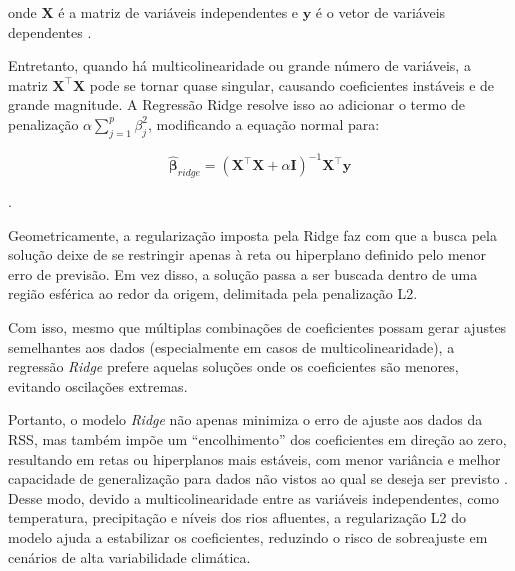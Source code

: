 \noindent onde $\mathbf{X}$ é a matriz de variáveis independentes e $\mathbf{y}$ é o vetor de variáveis dependentes \cite{montgomery2012}.

Entretanto, quando há multicolinearidade ou grande número de variáveis, a matriz $\mathbf{X}^\top \mathbf{X}$  pode se tornar quase singular, causando coeficientes instáveis e de grande magnitude. A Regressão Ridge resolve isso ao adicionar o termo de penalização $\alpha \sum_{j=1}^{p}\beta_{j}^2$, modificando a equação normal para:

\begin{equation}
	\hat{\boldsymbol\beta}_{ridge} = (\mathbf{X}^\top \mathbf{X} + \alpha \mathbf{I})^{-1} \mathbf{X}^\top \mathbf{y}
\end{equation}

\noindent \cite{ScikitLearnRidge2025}.

Geometricamente, a regularização imposta pela Ridge faz com que a busca pela solução deixe de se restringir apenas à reta ou hiperplano definido pelo menor erro de previsão. Em vez disso, a solução passa a ser buscada dentro de uma região esférica ao redor da origem, delimitada pela penalização L2.

Com isso, mesmo que múltiplas combinações de coeficientes possam gerar ajustes semelhantes aos dados (especialmente em casos de multicolinearidade), a regressão \textit{Ridge} prefere aquelas soluções onde os coeficientes são menores, evitando oscilações extremas.

Portanto, o modelo \textit{Ridge} não apenas minimiza o erro de ajuste aos dados da \gls{RSS}, mas também impõe um “encolhimento” dos coeficientes em direção ao zero, resultando em retas ou hiperplanos mais estáveis, com menor variância e melhor capacidade de generalização para dados não vistos ao qual se deseja ser previsto \cite{McDonald:2009:RR}. Desse modo, devido a multicolinearidade entre as variáveis independentes, como temperatura, precipitação e níveis dos rios afluentes, a regularização L2 do modelo ajuda a estabilizar os coeficientes, reduzindo o risco de sobreajuste em cenários de alta variabilidade climática.